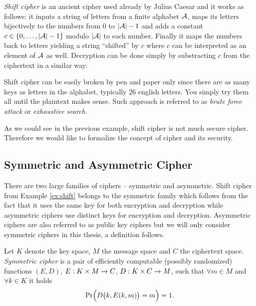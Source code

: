 \begin{example}
\label{ex:shift}
	{\em Shift cipher} is an ancient cipher used already by Julius Caesar and it works as follows: it inputs a string of letters from a finite alphabet $\cal A$, maps its letters bijectively to the numbers from $0$ to $|{\cal A}|-1$ and adds a constant $c\in\{0 , \ldots , |{\cal A}|-1\}$ modulo $|\cal A|$ to each number. Finally it maps the numbers back to letters yielding a string ``shifted'' by $c$ where $c$ can be interpreted as an element of $\cal A$ as well. Decryption can be done simply by substracting $c$ from the ciphertext in a similar way.
	
	Shift cipher can be easily broken by pen and paper only since there are as many keys as letters in the alphabet, typically $26$ english letters. You simply try them all until the plaintext makes sense. Such approach is referred to as {\em brute force attack} or {\em exhaustive search}.
\end{example}

As we could see in the previous example, shift cipher is not much secure cipher. Therefore we would like to formalize the concept of cipher and its security.



\subsection{Symmetric and Asymmetric Cipher}

There are two large families of ciphers -- symmetric and asymmetric. Shift cipher from Example \ref{ex:shift} belongs to the symmetric family which follows from the fact that it uses the same key for both encryption and decryption while asymmetric ciphers use distinct keys for encryption and decryption. Asymmetric ciphers are also referred to as public key ciphers but we will only consider symmetric ciphers in this thesis, a definition follows.

\begin{defn}
\label{def:symcipher}
	Let $K$ denote the key space, $M$ the message space and $C$ the ciphertext space. {\em Symmetric cipher} is a pair of efficiently computable (possibly randomized) functions $(E,D)$, $E:K\times M\rightarrow C$, $D:K\times C\rightarrow M$, such that $\forall m\in M$ and $\forall k\in K$ it holds
	\begin{equation}
		\Pr\Bigl(D\bigl(k,E(k,m)\bigr)=m\Bigr) = 1 . \label{eq:correct}
	\end{equation}
\end{defn}

